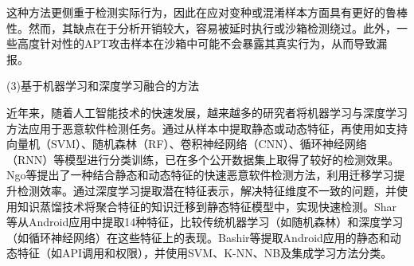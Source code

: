 
这种方法更侧重于检测实际行为，因此在应对变种或混淆样本方面具有更好的鲁棒性。然而，其缺点在于分析开销较大，容易被延时执行或沙箱检测绕过。此外，一些高度针对性的APT攻击样本在沙箱中可能不会暴露其真实行为，从而导致漏报。


(3)基于机器学习和深度学习融合的方法

近年来，随着人工智能技术的快速发展，越来越多的研究者将机器学习与深度学习方法应用于恶意软件检测任务。通过从样本中提取静态或动态特征，再使用如支持向量机（SVM）、随机森林（RF）、卷积神经网络（CNN）、循环神经网络（RNN）等模型进行分类训练，已在多个公开数据集上取得了较好的检测效果。Ngo等\cite{ngo2023fast}提出了一种结合静态和动态特征的快速恶意软件检测方法，利用迁移学习提升检测效率。通过深度学习提取潜在特征表示，解决特征维度不一致的问题，并使用知识蒸馏技术将聚合特征的知识迁移到静态特征模型中，实现快速检测。Shar等\cite{shar2023experimental}从Android应用中提取14种特征，比较传统机器学习（如随机森林）和深度学习（如循环神经网络）在这些特征上的表现。Bashir等\cite{bashir2024hybrid}提取Android应用的静态和动态特征（如API调用和权限），并使用SVM、K-NN、NB及集成学习方法分类。

